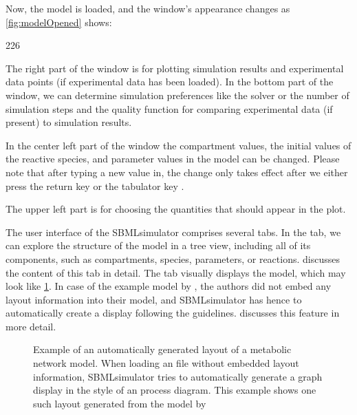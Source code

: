Now, the model is loaded, and the window's appearance changes as \cref{fig:modelOpened} shows:
\begin{dinglist}{226}
  \item The right part of the window is for plotting simulation results and experimental data points (if experimental data has been loaded).
In the bottom part of the window, we can determine simulation preferences like the solver or the number of simulation steps and the quality function for comparing experimental data (if present) to simulation results.
  \item In the center left part of the window the compartment values, the initial values of the reactive species, and parameter values in the model can be changed.
  Please note that after typing a new value in, the change only takes effect after we either press the return key \keys{\return} or the tabulator key \keys{\tab}.
  \item The upper left part is for choosing the quantities that should appear in the plot.
\end{dinglist}
The user interface of the SBMLsimulator comprises several tabs.
In the  tab, we can explore the structure of the model in a tree view, including all of its components, such as compartments, species, parameters, or reactions.
 discusses the content of this tab in detail.
The  tab visually displays the model, which may look like \cref{fig:AutomatedLayout}.
In case of the example model by \citeauthor{Bucher2011}, the authors did not embed any layout information into their model, and SBMLsimulator has hence to automatically create a display following the \SBGN guidelines.
 discusses this feature in more detail.
\begin{figure}[htb]
  \caption[Example of an automatically generated layout of a metabolic network model]{Example of an automatically generated layout of a metabolic network model.
  When loading an \SBML file without embedded layout information, SBMLsimulator tries to automatically generate a graph display in the style of an \SBGN process diagram.
  This example shows one such layout generated from the model by \citeauthor{Bucher2011}}
  \label{fig:AutomatedLayout}
\end{figure}

